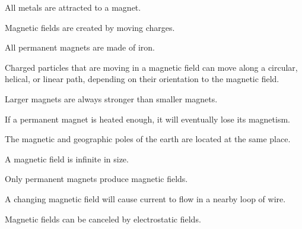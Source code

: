 \documentclass[10pt]{examdesign}
\begin{document}
\begin{truefalse}[title={True or False},
	rearrange=no]
	
	\begin{question}
		 All metals are attracted to a magnet.
	\end{question}

	\begin{question}
		 Magnetic fields are created by moving charges.
	\end{question}

	\begin{question}
	 All permanent magnets are made of iron.
\end{question}
	 
	\begin{question}
		 Charged particles that are moving in a magnetic field can move along a circular, helical, or linear path, depending on their orientation to the magnetic field. 
	\end{question}
	\begin{question}
	 Larger magnets are always stronger than smaller magnets.
\end{question}

\begin{question}
	 If a permanent magnet is heated enough, it will eventually lose its magnetism. 
\end{question}

\begin{question}
	 The magnetic and geographic poles of the earth are located at the same place.
\end{question}

\begin{question}
	 A magnetic field is infinite in size. 
	
\end{question}


\begin{question}
	 Only permanent magnets produce magnetic fields.
\end{question}

\begin{question}
	  A changing magnetic field will cause current to flow in a nearby loop of wire.
\end{question}

\begin{question}
	  Magnetic fields can be canceled by electrostatic fields. 
\end{question}


\end{truefalse}
\end{document}
